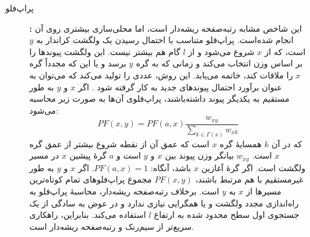 \begin{description}
\item[پراپ‌فلو]\textbf{:}
این شاخص مشابه رتبه‌صفحه ریشه‌دار است، اما محلی‌سازی بیشتری روی آن انجام شده‌است. پراپ‌فلو متناسب با احتمال رسیدن یک ولگشت کراندار به $y$ است، که از $x$ شروع می‌شود و از $l$ گام هم بیشتر نیست. این ولگشت پیوندها را بر اساس وزن انتخاب می‌کند و زمانی که به گره $y$ برسد و یا این که مجدداً گره $x$ را ملاقات کند، خاتمه می‌یابد. این روش، عددی را تولید می‌کند که می‌توان به عنوان برآورد احتمال پیوندهای جدید به کار گرفته شود \cite{lichtenwalter2010new}. 
اگر $x$ و $y$ به طور مستقیم به یکدیگر پیوند داشته‌باشند، پراپ‌فلوی آن‌ها به صورت زیر محاسبه می‌شود:
\begin{equation}
PF(x,y) = PF(a,x)\frac{w_{xy}}{\sum_{k \in \varGamma(x)} w_{xk}}
\end{equation}
که در آن $k$ همسایهٔ گره $x$ است که عمق آن از نقطه شروع بیشتر از عمق گره $x$ است. $w_{xy}$ بیانگر وزن پیوند بین $x$ و $y$ است و $a$ گرهٔ پیشین $x$ در مسیر ولگشت است. اگر گرهٔ آغازین $x$ باشد، آنگاه: $PF(a, x) = 1$.
اگر $x$ و $y$ به طور غیرمستقیم با هم مرتبط باشند، $PF(x, y)$ مجموع پراپ‌فلوهای تمام کوتاه‌ترین مسیرها از $x$ به $y$ است.
برخلاف رتبه‌صفحه ریشه‌دار، محاسبهٔ پراپ‌فلو به راه‌اندازی مجدد ولگشت و یا همگرایی نیازی ندارد و در عوض به سادگی از یک جستجوی اول سطح محدود شده به ارتفاع $l$ استفاده می‌کند. بنابراین، راهکاری سریع‌تر از سیم‌رنک و رتبه‌صفحه ریشه‌دار است.
\end{description}

